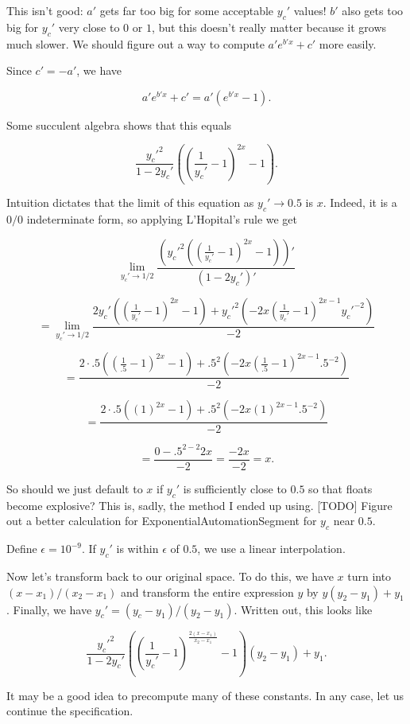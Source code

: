 \documentclass{article}
\begin{document}
This isn't good: $a'$ gets far too big for some acceptable $y_c'$ values! $b'$ also gets too big for $y_c'$ very close to $0$ or $1$, but this doesn't really matter because it grows much slower. We should figure out a way to compute $a'e^{b'x}+c'$ more easily.

Since $c' = -a'$, we have

$$a'e^{b'x}+c'=a'(e^{b'x}-1).$$

Some succulent algebra shows that this equals

$$\frac{y_c'^2}{1-2y_c'}\left(\left(\frac{1}{y_c'}-1\right)^{2x}-1\right).$$

Intuition dictates that the limit of this equation as $y_c'\to 0.5$ is $x$. Indeed, it is a $0/0$ indeterminate form, so applying L'Hopital's rule we get

$$\lim_{y_c'\to 1/2}\frac{\left(y_c'^2\left(\left(\frac{1}{y_c'}-1\right)^{2x}-1\right)\right)'}{\left(1-2y_c'\right)'}$$

$$=\lim_{y_c'\to 1/2}\frac{2y_c'\left(\left(\frac{1}{y_c'}-1\right)^{2x}-1\right)+y_c'^2\left(-2x\left(\frac{1}{y_c'}-1\right)^{2x-1}y_c'^{-2}\right)}{-2}$$

$$=\frac{2\cdot .5\left(\left(\frac{1}{.5}-1\right)^{2x}-1\right)+.5^2\left(-2x\left(\frac{1}{.5}-1\right)^{2x-1}.5^{-2}\right)}{-2}$$

$$=\frac{2\cdot .5\left(\left(1\right)^{2x}-1\right)+.5^2\left(-2x\left(1\right)^{2x-1}.5^{-2}\right)}{-2}$$

$$=\frac{0-.5^{2-2}2x}{-2}=\frac{-2x}{-2}=x.$$

So should we just default to $x$ if $y_c'$ is sufficiently close to $0.5$ so that floats become explosive? This is, sadly, the method I ended up using. [TODO] Figure out a better calculation for ExponentialAutomationSegment for $y_c$ near $0.5$.

Define $\epsilon=10^{-9}$. If $y_c'$ is within $\epsilon$ of $0.5$, we use a linear interpolation.

Now let's transform back to our original space. To do this, we have $x$ turn into $(x-x_1)/(x_2-x_1)$ and transform the entire expression $y$ by $y(y_2-y_1)+y_1$. Finally, we have $y_c'=(y_c-y_1)/(y_2-y_1)$. Written out, this looks like

$$\frac{y_c'^2}{1-2y_c'}\left(\left(\frac{1}{y_c'}-1\right)^{\frac{2(x-x_1)}{x_2-x_1}}-1\right)(y_2-y_1)+y_1.$$

It may be a good idea to precompute many of these constants. In any case, let us continue the specification.
\end{document}
